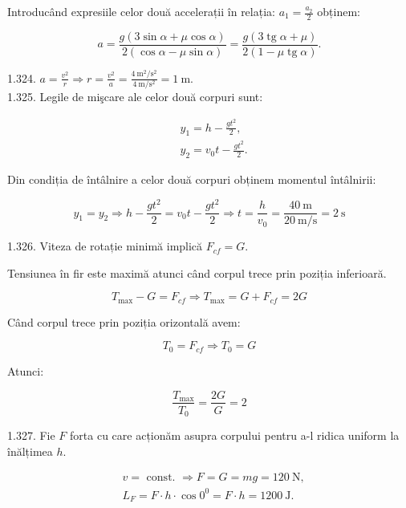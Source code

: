 Introducând expresiile celor două accelerații în relația: $a_{1}=\frac{a_{2}}{2}$ obținem:

$$
a=\frac{g(3 \sin \alpha+\mu \cos \alpha)}{2(\cos \alpha-\mu \sin \alpha)}=\frac{g(3 \operatorname{tg} \alpha+\mu)}{2(1-\mu \operatorname{tg} \alpha)} .
$$

1.324. $a=\frac{v^{2}}{r} \Rightarrow r=\frac{v^{2}}{a}=\frac{4 \mathrm{~m}^{2} / \mathrm{s}^{2}}{4 \mathrm{~m} / \mathrm{s}^{2}}=1 \mathrm{~m}$.\\
1.325. Legile de mişcare ale celor două corpuri sunt:

$$
\begin{aligned}
& y_{1}=h-\frac{g t^{2}}{2}, \\
& y_{2}=v_{0} t-\frac{g t^{2}}{2} .
\end{aligned}
$$

Din condiția de întâlnire a celor două corpuri obținem momentul întâlnirii:

$$
y_{1}=y_{2} \Rightarrow h-\frac{g t^{2}}{2}=v_{0} t-\frac{g t^{2}}{2} \Rightarrow t=\frac{h}{v_{0}}=\frac{40 \mathrm{~m}}{20 \mathrm{~m} / \mathrm{s}}=2 \mathrm{~s}
$$

1.326. Viteza de rotație minimă implică $F_{c f}=G$.

Tensiunea în fir este maximă atunci când corpul trece prin poziția inferioară.

$$
T_{\max }-G=F_{c f} \Rightarrow T_{\max }=G+F_{c f}=2 G
$$

Când corpul trece prin poziția orizontală avem:

$$
T_{0}=F_{c f} \Rightarrow T_{0}=G
$$

Atunci:

$$
\frac{T_{\max }}{T_{0}}=\frac{2 G}{G}=2
$$

1.327. Fie $F$ forta cu care acționăm asupra corpului pentru a-l ridica uniform la înălțimea $h$.

$$
\begin{aligned}
& v=\text { const. } \Rightarrow F=G=m g=120 \mathrm{~N}, \\
& L_{F}=F \cdot h \cdot \cos 0^{0}=F \cdot h=1200 \mathrm{~J} .
\end{aligned}
$$

